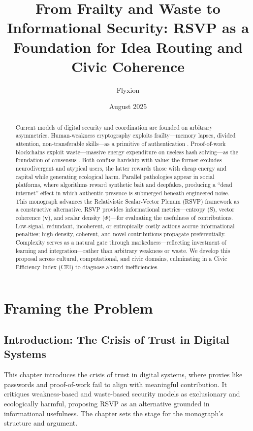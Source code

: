 \documentclass{book}
\title{From Frailty and Waste to Informational Security: RSVP as a Foundation for Idea Routing and Civic Coherence}
\author{Flyxion}
\date{August 2025}
\begin{document}
\maketitle

\begin{abstract}
Current models of digital security and coordination are founded on arbitrary asymmetries. Human-weakness cryptography exploits frailty—memory lapses, divided attention, non-transferable skills—as a primitive of authentication \cite{conitzer2020}. Proof-of-work blockchains exploit waste—massive energy expenditure on useless hash solving—as the foundation of consensus \cite{nakamoto2008}. Both confuse hardship with value: the former excludes neurodivergent and atypical users, the latter rewards those with cheap energy and capital while generating ecological harm. Parallel pathologies appear in social platforms, where algorithms reward synthetic bait and deepfakes, producing a ``dead internet'' effect in which authentic presence is submerged beneath engineered noise. This monograph advances the Relativistic Scalar-Vector Plenum (RSVP) framework as a constructive alternative. RSVP provides informational metrics—entropy (S), vector coherence (\(\mathbf{v}\)), and scalar density (\(\Phi\))—for evaluating the usefulness of contributions. Low-signal, redundant, incoherent, or entropically costly actions accrue informational penalties; high-density, coherent, and novel contributions propagate preferentially. Complexity serves as a natural gate through markedness—reflecting investment of learning and integration—rather than arbitrary weakness or waste. We develop this proposal across cultural, computational, and civic domains, culminating in a Civic Efficiency Index (CEI) to diagnose absurd inefficiencies.
\end{abstract}

\tableofcontents

\part{Framing the Problem}

\chapter{Introduction: The Crisis of Trust in Digital Systems}

This chapter introduces the crisis of trust in digital systems, where proxies like passwords and proof-of-work fail to align with meaningful contribution. It critiques weakness-based and waste-based security models as exclusionary and ecologically harmful, proposing RSVP as an alternative grounded in informational usefulness. The chapter sets the stage for the monograph's structure and argument.
\end{document}
